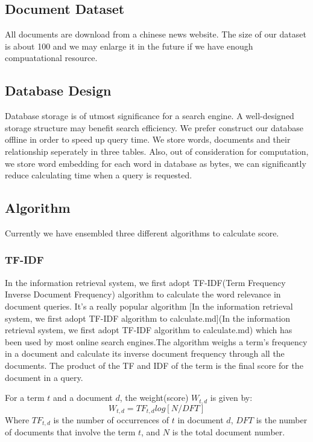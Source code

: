 \documentclass[UTF8]{article}
\begin{document}
	
	
	\subsection{Document Dataset}
	All documents are download from a chinese news website. The size of our dataset is about 100 and we may enlarge it in the future if we have enough compuatational resource.
	
	
	\subsection{Database Design}
	Database storage is of utmost significance for a search engine. A well-designed storage structure may benefit search efficiency. We prefer construct our database offline in order to speed up query time. We store words, documents and their relationship seperately in three tables. Also, out of consideration for computation, we store word embedding for each word in database as bytes, we can significantly reduce calculating time when a query is requested.
	
	
	\subsection{Algorithm}
	Currently we have ensembled three different algorithms to calculate score.
	
	\subsubsection{TF-IDF}
	In the information retrieval system, we first adopt TF-IDF(Term Frequency Inverse Document Frequency) algorithm to calculate the word relevance in document queries. It's a really popular algorithm  [In the information retrieval system, we first adopt TF-IDF algorithm to calculate.md](In the information retrieval system, we first adopt TF-IDF algorithm to calculate.md) which has been used by most online search engines.The algorithm weighs a term's frequency in a document and calculate its inverse document frequency through all the documents. The product of the TF and IDF of the term is the final score for the document in a query.
	
	For a term $t$ and a document $d$, the weight(score) $W_{t,d}$ is given by:
	\[ W_{t,d} = TF_{t,d}log[N/DFT] \]
	Where $TF_{t,d}$ is the number of occurrences of $t$ in document $d$, $DFT$ is the number of documents that involve the term $t$, and $N$ is the total document number.
	
\end{document}

